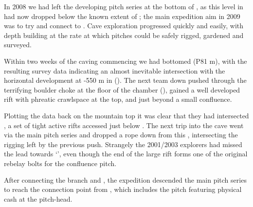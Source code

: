 In 2008 we had left the developing pitch series at the bottom of
, as this level in  had now
dropped below the known extent of ; the main expedition aim in
2009 was to try and connect  to . Cave
exploration progressed quickly and easily, with depth building at the
rate at which pitches could be safely rigged, gardened and surveyed.

Within two weeks of the caving commencing we had bottomed  (P81 m), with the resulting survey data indicating an almost
inevitable intersection with the horizontal development at -550 m in
 (). The next team down pushed
through the terrifying boulder choke at the floor of the chamber
(), gained a well developed rift with phreatic
crawlspace at the top, and 
just beyond a small confluence.

Plotting the data back on the mountain top it was clear that they had
intersected , a set of tight active rifts accessed
just below . The next trip into the cave went
via the main pitch series and dropped a rope down from this , intersecting the rigging left by the previous push. Strangely
the 2001/2003 explorers had missed the lead towards `', even though the end of the large rift forms one of the
original rebelay bolts for the confluence pitch.

    \begin{marginfigure}
\checkoddpage \ifoddpage \forcerectofloat \else \forceversofloat \fi
\centering
 \caption{After connecting the  branch and , the expedition descended the main  pitch series to reach the connection point from , which includes the pitch  featuring physical cash at the pitch-head. }
 \label{fistful of tolars}
\end{marginfigure}

